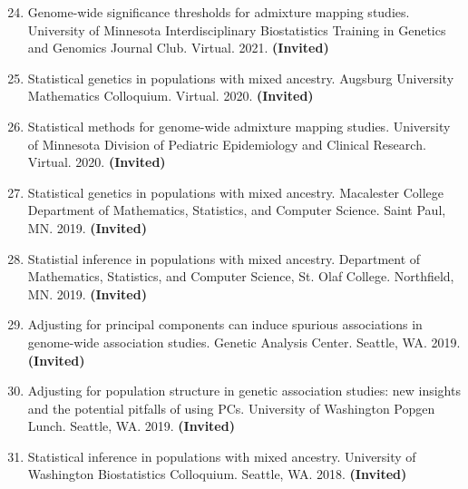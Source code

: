 \documentclass[margin]{res}
\newenvironment{benumerate}[1]{
    \let\oldItem\item
    \def\item{\addtocounter{enumi}{-2}\oldItem}
    
    \begin{enumerate}
    \setcounter{enumi}{#1}
    \addtocounter{enumi}{1}
}{
    \end{enumerate}
}
\begin{document}
\begin{resume}
\begin{benumerate}{23}
\item Genome-wide significance thresholds for admixture mapping studies. University of Minnesota Interdisciplinary Biostatistics Training in Genetics and Genomics Journal Club. Virtual. 2021. \textbf{(Invited)}

\item Statistical genetics in populations with mixed ancestry. Augsburg University Mathematics Colloquium. Virtual. 2020. \textbf{(Invited)}

\item Statistical methods for genome-wide admixture mapping studies. University of Minnesota Division of Pediatric Epidemiology and Clinical Research. Virtual. 2020. \textbf{(Invited)}

\item Statistical genetics in populations with mixed ancestry. Macalester College Department of Mathematics, Statistics, and Computer Science. Saint Paul, MN. 2019. \textbf{(Invited)}

\item Statistial inference in populations with mixed ancestry. Department of Mathematics, Statistics, and Computer Science, St. Olaf College. Northfield, MN. 2019. \textbf{(Invited)}

\item Adjusting for principal components can induce spurious associations in genome-wide association studies. Genetic Analysis Center. Seattle, WA. 2019. \textbf{(Invited)}

\item Adjusting for population structure in genetic association studies: new insights and the potential pitfalls of using PCs. University of Washington Popgen Lunch. Seattle, WA. 2019.  \textbf{(Invited)}





\item %
Statistical inference in populations with mixed ancestry. University of Washington Biostatistics Colloquium. Seattle, WA. 2018.  \textbf{(Invited)}


\end{benumerate}
\end{resume}
\end{document}
